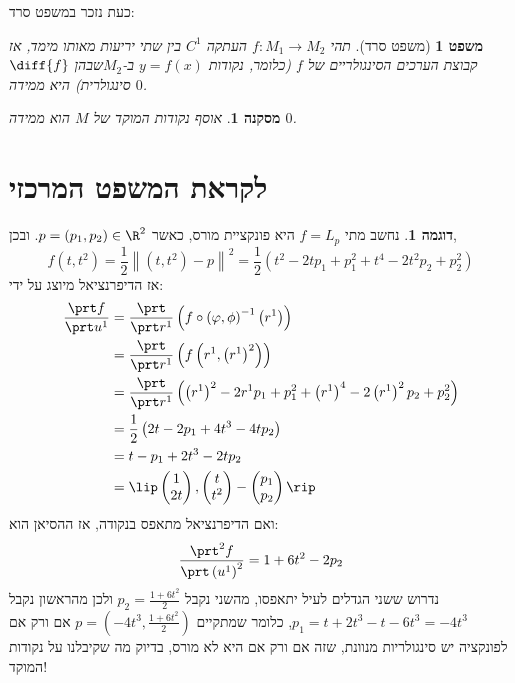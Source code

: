 \documentclass{article}
\newtheorem{corollary}{מסקנה}
\newtheorem*{theorem*}{משפט}
\theoremstyle{definition}
\newtheorem*{example*}{דוגמה}
\newcommand{\norm}[1]{\left\lVert#1\right\rVert}
\begin{document}
	כעת נזכר במשפט סרד:
	\begin{theorem*}[משפט סרד]
		תהי
		\(f:M_1\to M_2\)
		העתקה
		\(C^1\)
		בין שתי יריעות מאותו מימד,
		אז קבוצת הערכים הסינגולריים של \(f\)
		(כלומר, נקודות \(y=f(x)\) ב-\(M_2\)שבהן \(\diff{f}\) סינגולרית)
		היא ממידה \(0\).
	\end{theorem*}

	\begin{corollary}\label{measure-zero}
		אוסף נקודות המוקד של \(M\) הוא ממידה \(0\).
	\end{corollary}




	\section{לקראת המשפט המרכזי}
	\begin{example*}
		נחשב מתי
		\(f=L_p\)
		היא פונקציית מורס, כאשר
		\(p=(p_1,p_2)\in \R^2\).
		ובכן,
		\[
			f(t,t^2)
			=\frac{1}{2}\norm{(t,t^2)-p}^2
			=\frac{1}{2}\left(t^2-2tp_1+p_1^2+t^4-2t^2p_2+p_2^2\right)
		\]
		אז הדיפרנציאל מיוצג על ידי:
		\begin{equation*}\begin{split}
			\frac{\prt f}{\prt u^1}
			&=\frac{\prt}{\prt r^1}\left(f\circ\left(\varphi,\phi\right)^{-1}\left(r^1\right)\right)
			\\&=\frac{\prt}{\prt r^1}\left(f\left(r^1,\left(r^1\right)^2\right)\right)
			\\&=\frac{\prt}{\prt r^1}\left(\left(r^1\right)^2-2r^1 p_1+p_1^2+\left(r^1\right)^4-2\left(r^1\right)^2p_2+p_2^2\right)
			\\&=\frac{1}{2}\left(2t-2p_1+4t^3-4tp_2\right)
			\\&=t-p_1+2t^3-2tp_2
			\\&=\lip
				\begin{pmatrix}
					1 \\ 2t
				\end{pmatrix},
				\begin{pmatrix}
					t \\ t^2
				\end{pmatrix}
				-\begin{pmatrix}
				p_1 \\ p_2
				\end{pmatrix}
			\rip
		\end{split}\end{equation*}
		ואם הדיפרנציאל מתאפס בנקודה, אז ההסיאן הוא:
		\[
			\frac{\prt^2 f}{\prt \left(u^1\right)^2}
			=1+6t^2-2p_2
		\]
		נדרוש ששני הגדלים לעיל יתאפסו, מהשני נקבל
		\(p_2=\frac{1+6t^2}{2}\)
		ולכן מהראשון נקבל
		\(p_1=t+2t^3-t-6t^3=-4t^3\),
		כלומר שמתקיים
		\(p=\left(-4t^3,\frac{1+6t^2}{2}\right)\)
		אם ורק אם לפונקציה יש סינגולריות מנוונת, שזה אם ורק אם היא לא מורס,
		בדיוק מה שקיבלנו על נקודות המוקד!
	\end{example*}
\end{document}
